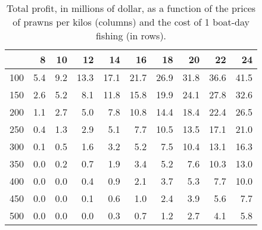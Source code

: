 \begin{table}[ht]
\centering
\begin{tabular}{rrrrrrrrrr}
  \hline
 & 8 & 10 & 12 & 14 & 16 & 18 & 20 & 22 & 24 \\ 
  \hline
100 & 5.4 & 9.2 & 13.3 & 17.1 & 21.7 & 26.9 & 31.8 & 36.6 & 41.5 \\ 
  150 & 2.6 & 5.2 & 8.1 & 11.8 & 15.8 & 19.9 & 24.1 & 27.8 & 32.6 \\ 
  200 & 1.1 & 2.7 & 5.0 & 7.8 & 10.8 & 14.4 & 18.4 & 22.4 & 26.5 \\ 
  250 & 0.4 & 1.3 & 2.9 & 5.1 & 7.7 & 10.5 & 13.5 & 17.1 & 21.0 \\ 
  300 & 0.1 & 0.5 & 1.6 & 3.2 & 5.2 & 7.5 & 10.4 & 13.1 & 16.3 \\ 
  350 & 0.0 & 0.2 & 0.7 & 1.9 & 3.4 & 5.2 & 7.6 & 10.3 & 13.0 \\ 
  400 & 0.0 & 0.0 & 0.4 & 0.9 & 2.1 & 3.7 & 5.3 & 7.7 & 10.0 \\ 
  450 & 0.0 & 0.0 & 0.1 & 0.6 & 1.0 & 2.4 & 3.9 & 5.6 & 7.7 \\ 
  500 & 0.0 & 0.0 & 0.0 & 0.3 & 0.7 & 1.2 & 2.7 & 4.1 & 5.8 \\ 
   \hline
\end{tabular}
\caption{Total profit, in millions of dollar, as a function of the prices of prawns per kilos (columns) and the cost of 1 boat-day fishing (in rows).} 
\label{tab:AverageValueAsFctPricesAndCosts}
\end{table}
